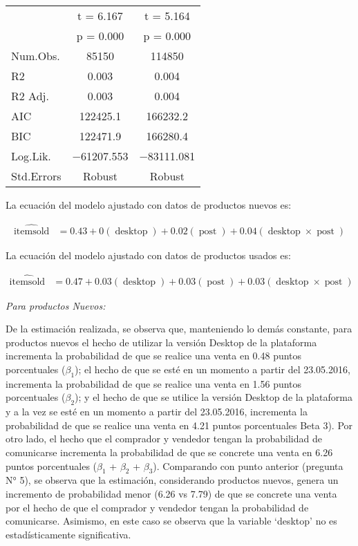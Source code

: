 \documentclass[
  12pt]{article}
\begin{document}
\begin{table}[H]
\begin{tabular}[t]{lcc}
 & t = \num{6.167} & t = \num{5.164}\\
 & p = \num{0.000} & p = \num{0.000}\\
\midrule
Num.Obs. & \num{85150} & \num{114850}\\
R2 & \num{0.003} & \num{0.004}\\
R2 Adj. & \num{0.003} & \num{0.004}\\
AIC & \num{122425.1} & \num{166232.2}\\
BIC & \num{122471.9} & \num{166280.4}\\
Log.Lik. & \num{-61207.553} & \num{-83111.081}\\
Std.Errors & Robust & Robust\\
\bottomrule
\end{tabular}
\end{table}

La ecuación del modelo ajustado con datos de productos nuevos es:

\begin{equation}
\begin{aligned}
\operatorname{\widehat{itemsold}} &= 0.43 + 0(\operatorname{desktop}) + 0.02(\operatorname{post}) + 0.04(\operatorname{desktop} \times \operatorname{post})
\end{aligned}
\end{equation}

La ecuación del modelo ajustado con datos de productos usados es:

\begin{equation}
\begin{aligned}
\operatorname{\widehat{itemsold}} &= 0.47 + 0.03(\operatorname{desktop}) + 0.03(\operatorname{post}) + 0.03(\operatorname{desktop} \times \operatorname{post})
\end{aligned}
\end{equation}

\emph{Para productos Nuevos:}

De la estimación realizada, se observa que, manteniendo lo demás constante, para productos nuevos el hecho de utilizar la versión Desktop de la plataforma incrementa la probabilidad de que se realice una venta en 0.48 puntos porcentuales (\(\beta_1\)); el hecho de que se esté en un momento a partir del 23.05.2016, incrementa la probabilidad de que se realice una venta en 1.56 puntos porcentuales (\(\beta_2\)); y el hecho de que se utilice la versión Desktop de la plataforma y a la vez se esté en un momento a partir del 23.05.2016, incrementa la probabilidad de que se realice una venta en 4.21 puntos porcentuales Beta 3).
Por otro lado, el hecho que el comprador y vendedor tengan la probabilidad de comunicarse incrementa la probabilidad de que se concrete una venta en 6.26 puntos porcentuales (\(\beta_1\) + \(\beta_2\) + \(\beta_3\)).
Comparando con punto anterior (pregunta N° 5), se observa que la estimación, considerando productos nuevos, genera un incremento de probabilidad menor (6.26 vs 7.79) de que se concrete una venta por el hecho de que el comprador y vendedor tengan la probabilidad de comunicarse. Asimismo, en este caso se observa que la variable `desktop' no es estadísticamente significativa.
\end{document}
